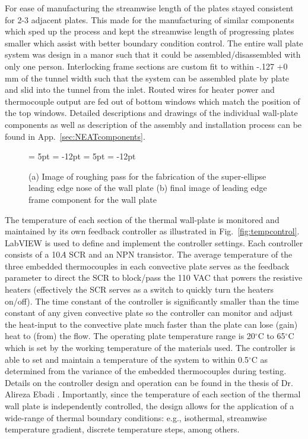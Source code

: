 For ease of manufacturing the streamwise length of the plates stayed consistent for 2-3 adjacent plates.
This made for the manufacturing of similar components which sped up the process and kept the streamwise length of progressing plates smaller which assist with better boundary condition control.
The entire wall plate system was design in a manor such that it could be assembled/disassembled with only one person. 
Interlocking frame sections are custom fit to within -.127 +0 mm of the tunnel width such that the system can be assembled plate by plate and slid into the tunnel from the inlet.
Routed wires for heater power and thermocouple output are fed out of bottom windows which match the position of the top windows.
Detailed descriptions and drawings of the individual wall-plate components as well as description of the assembly and installation process can be found in App.~\ref{sec:NEATcomponents}.

\begin{figure}[h!]
  \begin{center}
  {\subfigcapskip = 5pt \subfigcapmargin = -12pt }
   {\subfigcapskip = 5pt \subfigcapmargin = -12pt  }
  \end{center}
\caption{(a) Image of roughing pass for the fabrication of the super-ellipse leading edge nose of the wall plate (b) final image of leading edge frame component for the wall plate} 
\label{fig:nose}
\end{figure}

The temperature of each section of the thermal wall-plate is monitored and maintained by its own feedback controller as illustrated in Fig.~\ref{fig:tempcontrol}.  
LabVIEW is used to define and implement the controller settings. Each controller consists of a 10$A$ SCR and an NPN transistor. 
The average temperature of the three embedded thermocouples in each convective plate serves as the feedback parameter to direct the SCR to block/pass the 110 VAC that powers the resistive heaters (effectively the SCR serves as a switch to quickly turn the heaters on/off). 
The time constant of the controller is significantly smaller than the time constant of any given convective plate so the controller can monitor and adjust the heat-input to the convective plate much faster than the plate can lose (gain) heat to (from) the flow. 
The operating plate temperature range is 20$^\circ$C to 65$^\circ$C which is set by the working temperature of the materials used.
The controller is able to set and maintain a temperature of the system to within 0.5$^\circ$C as determined from the variance of the embedded thermocouples during testing. 
Details on the controller design and operation can be found in the thesis of Dr. Alireza Ebadi \cite{Ebadi2016}.
Importantly, since the temperature of each section of the thermal wall plate is independently controlled, the design allows for the application of a wide-range of thermal boundary conditions: e.g., isothermal, streamwise temperature gradient, discrete temperature steps, among others.

